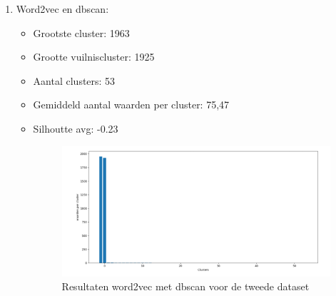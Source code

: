 \begin{enumerate}
    \item Word2vec en dbscan:
    \begin{itemize}
        \item Grootste cluster: 1963
        \item Grootte vuilniscluster: 1925
        \item Aantal clusters: 53
        \item Gemiddeld aantal waarden per cluster: 75,47
        \item Silhoutte avg:  -0.23

        \begin{figure}[h]
            \centering
            \includegraphics[width=0.7\linewidth]{../foto's/winedataword2vecdbscan}
            \caption{Resultaten word2vec met dbscan voor de tweede dataset}
            \label{fig:dataset2_word2vec_dbscan}
        \end{figure}
    \end{itemize}
\end{enumerate}

